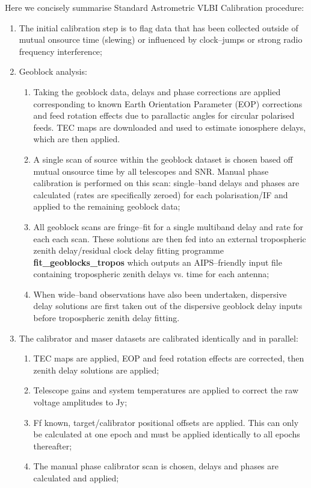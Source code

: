 	Here we concisely summarise Standard Astrometric VLBI Calibration procedure:
	\begin{enumerate}
		\item The initial calibration step is to flag data that has been collected outside of mutual onsource time (slewing) or influenced by clock--jumps or strong radio frequency interference;
		\item Geoblock analysis:\begin{enumerate}
			\item Taking the geoblock data, delays and phase corrections are applied corresponding to known Earth Orientation Parameter (EOP) corrections and feed rotation effects due to parallactic angles for circular polarised feeds. TEC maps are downloaded and used to estimate ionosphere delays, which are then applied. 
			\item A single scan of source within the geoblock dataset is chosen based off mutual onsource time by all telescopes and SNR. Manual phase calibration is performed on this scan: single--band delays and phases are calculated (rates are specifically zeroed) for each polarisation/IF and applied to the remaining geoblock data;
			\item All geoblock scans are fringe--fit for a single multiband delay and rate for each each scan. These solutions are then fed into an external tropospheric zenith delay/residual clock delay fitting programme {\bf fit\_geoblocks\_tropos} which outputs an AIPS--friendly input file containing tropospheric zenith delays vs. time for each antenna;
			\item When wide--band observations have also been undertaken, dispersive delay solutions are first taken out of the dispersive geoblock delay inputs before tropospheric zenith delay fitting.
		\end{enumerate}
		\item The calibrator and maser datasets are calibrated identically and in parallel:
		\begin{enumerate}
			\item TEC maps are applied, EOP and feed rotation effects are corrected, then zenith delay solutions are applied;
			\item Telescope gains and system temperatures are applied to correct the raw voltage amplitudes to Jy;
			\item Ff known, target/calibrator positional offsets are applied. This can only be calculated at one epoch and must be applied identically to all epochs thereafter;
			\item The manual phase calibrator scan is chosen, delays and phases are calculated and applied;

\end{enumerate}
\end{enumerate}
